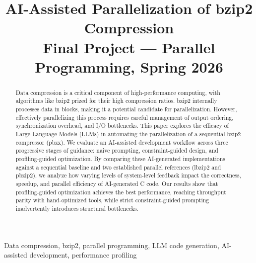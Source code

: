 \documentclass[conference]{IEEEtran}
\begin{document}
\title{AI-Assisted Parallelization of bzip2 Compression\\
{\footnotesize Final Project --- Parallel Programming, Spring 2026}}

\author{%
%
}

\maketitle

\begin{abstract}
Data compression is a critical component of high-performance computing, with algorithms like bzip2 prized for their high compression ratios. bzip2 internally processes data in blocks, making it a potential candidate for parallelization. However, effectively parallelizing this process requires careful management of output ordering, synchronization overhead, and I/O bottlenecks. This paper explores the efficacy of Large Language Models (LLMs) in automating the parallelization of a sequential bzip2 compressor (pbzx). We evaluate an AI-assisted development workflow across three progressive stages of guidance: naive prompting, constraint-guided design, and profiling-guided optimization. By comparing these AI-generated implementations against a sequential baseline and two established parallel references (lbzip2 and pbzip2), we analyze how varying levels of system-level feedback impact the correctness, speedup, and parallel efficiency of AI-generated C code. Our results show that profiling-guided optimization achieves the best performance, reaching throughput parity with hand-optimized tools, while strict constraint-guided prompting inadvertently introduces structural bottlenecks.
\end{abstract}

\begin{IEEEkeywords}
Data compression, bzip2, parallel programming, LLM code generation, AI-assisted development, performance profiling 
\end{IEEEkeywords}

\vspace{0.5em}
\noindent{}
\end{document}
